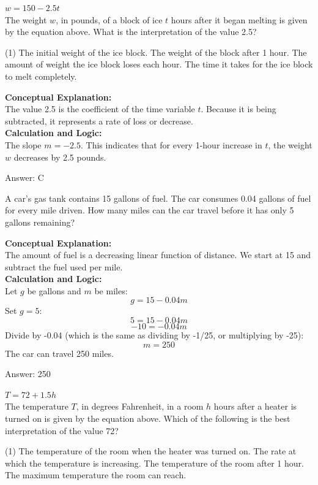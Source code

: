 \documentclass[11pt,paper=a4,answers]{exam}
\begin{document}
\begin{questions}
\question
$w = 150 - 2.5t$ \\
The weight $w$, in pounds, of a block of ice $t$ hours after it began melting is given by the equation above. What is the interpretation of the value 2.5?
\begin{tasks}(1)
    \task The initial weight of the ice block.
    \task The weight of the block after 1 hour.
    \task The amount of weight the ice block loses each hour.
    \task The time it takes for the ice block to melt completely.
\end{tasks}

\begin{solution}
\textbf{Conceptual Explanation:} \\
The value 2.5 is the coefficient of the time variable $t$. Because it is being subtracted, it represents a rate of loss or decrease.
\\[10pt]
\textbf{Calculation and Logic:} \\
The slope $m = -2.5$. This indicates that for every 1-hour increase in $t$, the weight $w$ decreases by 2.5 pounds.

\vspace{15pt}
Answer: \colorbox{yellow!100}{C}
\end{solution}

\question
A car's gas tank contains 15 gallons of fuel. The car consumes 0.04 gallons of fuel for every mile driven. How many miles can the car travel before it has only 5 gallons remaining?

\begin{solution}
\textbf{Conceptual Explanation:} \\
The amount of fuel is a decreasing linear function of distance. We start at 15 and subtract the fuel used per mile.
\\[10pt]
\textbf{Calculation and Logic:} \\
Let $g$ be gallons and $m$ be miles:
\[g = 15 - 0.04m\]
Set $g = 5$:
\[5 = 15 - 0.04m\]
\[-10 = -0.04m\]
Divide by -0.04 (which is the same as dividing by -1/25, or multiplying by -25):
\[m = 250\]
The car can travel 250 miles.

\vspace{15pt}
Answer: \colorbox{yellow!100}{250}
\end{solution}

\question
$T = 72 + 1.5h$ \\
The temperature $T$, in degrees Fahrenheit, in a room $h$ hours after a heater is turned on is given by the equation above. Which of the following is the best interpretation of the value 72?
\begin{tasks}(1)
    \task The temperature of the room when the heater was turned on.
    \task The rate at which the temperature is increasing.
    \task The temperature of the room after 1 hour.
    \task The maximum temperature the room can reach.
\end{tasks}


\end{questions}
\end{document}
